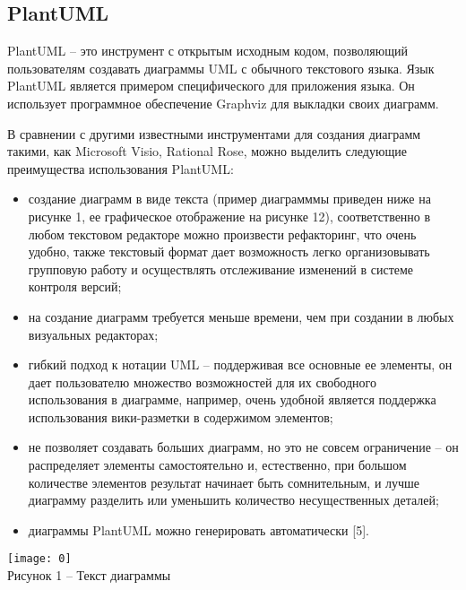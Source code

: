 \subsection{PlantUML}
PlantUML -- это инструмент с открытым исходным кодом, позволяющий пользователям создавать диаграммы UML с обычного текстового языка. Язык PlantUML является примером специфического для приложения языка. Он использует программное обеспечение Graphviz для выкладки своих диаграмм.\par
В сравнении с другими известными инструментами для создания диаграмм такими, как Microsoft Visio, Rational Rose, можно выделить следующие преимущества использования PlantUML:
\begin{itemize}
    \item создание диаграмм в виде текста (пример диаграмммы приведен ниже на рисунке 1, ее графическое отображение на рисунке 12), соответственно в любом текстовом редакторе можно произвести рефакторинг, что очень удобно, также текстовый формат дает возможность легко организовывать групповую работу и осуществлять отслеживание изменений в системе контроля версий;
    \item на создание диаграмм требуется меньше времени, чем при создании в любых визуальных редакторах;
    \item гибкий подход к нотации UML -- поддерживая все основные ее элементы, он дает пользователю множество возможностей для их свободного использования в диаграмме, например, очень удобной является поддержка использования вики-разметки в содержимом элементов;
    \item не позволяет создавать больших диаграмм, но это не совсем ограничение -- он распределяет элементы самостоятельно и, естественно, при большом количестве элементов результат начинает быть сомнительным, и лучше диаграмму разделить или уменьшить количество несущественных деталей;
    \item диаграммы PlantUML можно генерировать автоматически [5].
\end{itemize}
\vspace{\baselineskip}
\begin{center}
\texttt{[image: 0]}\\
Рисунок 1 -- Текст диаграммы\\
\end{center}
\vspace{\baselineskip}


